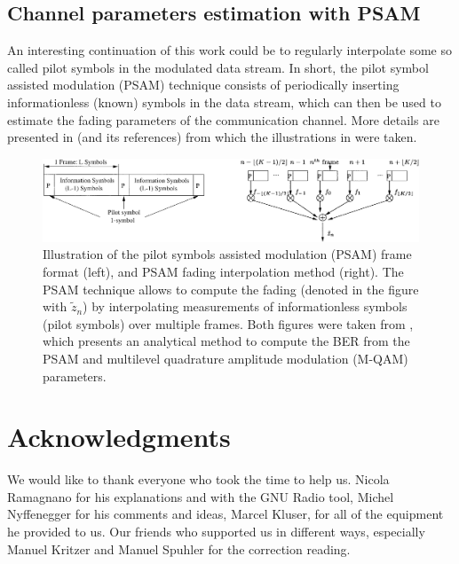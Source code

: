 

\subsection{Channel parameters estimation with PSAM} \label{sec:psam}

An interesting continuation of this work could be to regularly interpolate some so called pilot symbols in the modulated data stream. In short, the pilot symbol assisted modulation (PSAM) technique consists of periodically inserting informationless (known) symbols in the data stream, which can then be used to estimate the fading parameters of the communication channel. More details are presented in \cite{Xiaoyi1999} (and its references) from which the illustrations in  were taken.

\begin{figure}
	\centering
	\includegraphics[width = \linewidth]{figures/xiaoyi-psam-figures}
	\caption{
		Illustration of the pilot symbols assisted modulation (PSAM) frame format (left), and PSAM fading interpolation method (right). The PSAM technique allows to compute the fading (denoted in the figure with \(\tilde{z}_n\)) by interpolating measurements of informationless symbols (pilot symbols) over multiple frames. Both figures were taken from \cite{Xiaoyi1999}, which presents an analytical method to compute the BER from the PSAM and multilevel quadrature amplitude modulation (M-QAM) parameters.
		\label{fig:psam}
	}
\end{figure}



\section{Acknowledgments}

We would like to thank everyone who took the time to help us. Nicola Ramagnano for his explanations and with the GNU Radio tool, Michel Nyffenegger for his comments and ideas, Marcel Kluser, for all of the equipment he provided to us. Our friends who supported us in different ways, especially Manuel Kritzer and Manuel Spuhler for the correction reading.




